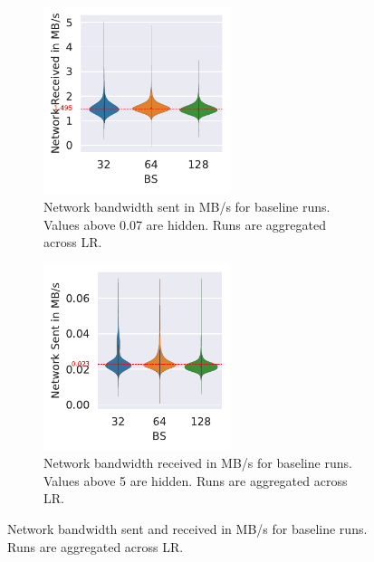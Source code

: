 \begin{figure}[ht]
    \centering
    \begin{subfigure}[t]{0.475 \textwidth}
        \centering
        \caption{Network bandwidth sent in MB/s for baseline runs. Values above 0.07 are hidden. Runs are aggregated across LR.}
        \label{fig:net-sent_baseline}
        \includegraphics[width=0.6\textwidth]{./figures/06_net-recv_baseline-16vCPUs-GAS-1.pdf}
    \end{subfigure}
    \centering
    \begin{subfigure}[t]{0.475 \textwidth}
        \centering
        \caption{Network bandwidth received in MB/s for baseline runs. Values above 5 are hidden. Runs are aggregated across LR.}
        \label{fig:net-recv_baseline}
        \includegraphics[width=0.6\textwidth]{./figures/06_net-sent_baseline-16vCPUs-GAS-1.pdf}
    \end{subfigure}%
    \hfill
    \caption{Network bandwidth sent and received in MB/s for baseline runs. Runs are aggregated across LR.}
\end{figure}

